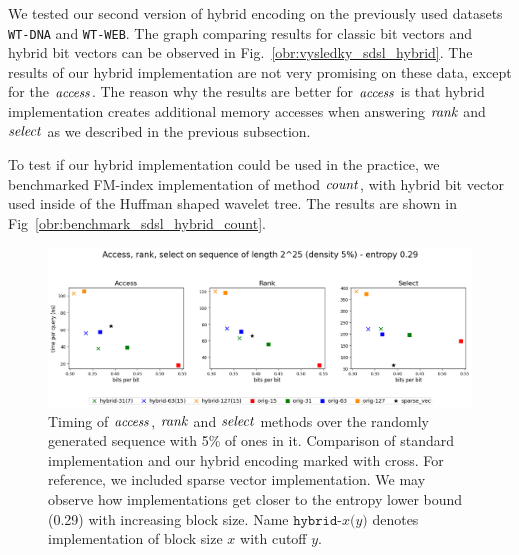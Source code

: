 We tested our second version of hybrid encoding on the previously used datasets \texttt{WT-DNA}
and \texttt{WT-WEB}. The graph comparing results for classic bit vectors and hybrid bit vectors
can be observed in Fig.~\ref{obr:vysledky_sdsl_hybrid}. The results of our hybrid implementation
are not very promising on these data, except for the $\mathit{access}$. The reason why the results are
better for $\mathit{access}$ is that hybrid implementation creates additional memory accesses when answering
$\mathit{rank}$ and $\mathit{select}$ as we described in the previous subsection. 

To test if our hybrid implementation could be used in the practice, we benchmarked FM-index
implementation of method $\mathit{count}$, with hybrid bit vector used inside of the Huffman shaped
wavelet tree. The results are shown in Fig~\ref{obr:benchmark_sdsl_hybrid_count}.

\begin{figure}
	\centerline{
		\includegraphics[width=\textwidth, height=0.27\textheight]{images/vysledky_hybrid_artif}
	}
	\caption[TODO]{Timing of $\mathit{access}$, $\mathit{rank}$ and $\mathit{select}$ methods over the randomly generated
	sequence with 5\% of ones in it. Comparison of standard implementation and our hybrid encoding
	marked with cross. For reference, we included sparse vector implementation. We may observe how
	implementations get closer to the entropy lower bound (0.29) with increasing block size. Name
	$\texttt{hybrid-}x\texttt{(}y\texttt{)}$ denotes implementation of block size $x$ with cutoff $y$.
	}
	\label{obr:vysledky_hybrid_artif}
\end{figure}

